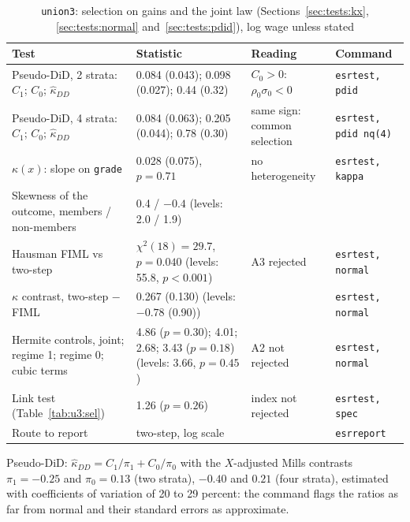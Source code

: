 \documentclass[11pt,a4paper]{article}
\theoremstyle{plain}
\theoremstyle{definition}
\theoremstyle{remark}
\newcommand{\1}{\mathbf{1}}
\newcommand{\cmd}[1]{\texttt{#1}}
\newcommand{\kX}{\kappa(x)}
\begin{document}
\begin{table}[!htb]
\centering
\caption{\cmd{union3}: selection on gains and the joint law (Sections~\ref{sec:tests:kx}, \ref{sec:tests:normal} and~\ref{sec:tests:pdid}), log wage unless stated}
\label{tab:u3:tests}
\scriptsize
\begin{tabular}{@{}L{4.2cm}L{5.6cm}L{2.5cm}L{2.3cm}@{}}
\toprule
Test & Statistic & Reading & Command \\
\midrule
Pseudo-DiD, 2 strata: $C_1$; $C_0$; $\hat\kappa_{DD}$ & 0.084 (0.043); 0.098 (0.027); 0.44 (0.32) & $C_0>0$: $\rho_0\sigma_0<0$ & \cmd{esrtest, pdid} \\
Pseudo-DiD, 4 strata: $C_1$; $C_0$; $\hat\kappa_{DD}$ & 0.084 (0.063); 0.205 (0.044); 0.78 (0.30) & same sign: common selection & \cmd{esrtest, pdid nq(4)} \\
$\kX$: slope on \cmd{grade} & 0.028 (0.075), $p=0.71$ & no heterogeneity & \cmd{esrtest, kappa} \\
\addlinespace
Skewness of the outcome, members / non-members & 0.4 / $-0.4$ (levels: 2.0 / 1.9) & & \\
Hausman FIML vs two-step & $\chi^2(18)=29.7$, $p=0.040$ (levels: 55.8, $p<0.001$) & A3 rejected & \cmd{esrtest, normal} \\
$\kappa$ contrast, two-step $-$ FIML & 0.267 (0.130) (levels: $-0.78$ (0.90)) & & \cmd{esrtest, normal} \\
Hermite controls, joint; regime 1; regime 0; cubic terms & 4.86 ($p=0.30$); 4.01; 2.68; 3.43 ($p=0.18$) (levels: 3.66, $p=0.45$) & A2 not rejected & \cmd{esrtest, normal} \\
Link test (Table~\ref{tab:u3:sel}) & 1.26 ($p=0.26$) & index not rejected & \cmd{esrtest, spec} \\
\midrule
Route to report & two-step, log scale & & \cmd{esrreport} \\
\bottomrule
\end{tabular}
\parbox{0.95\textwidth}{\footnotesize Pseudo-DiD: $\hat\kappa_{DD}=C_1/\pi_1+C_0/\pi_0$ with the $X$-adjusted Mills contrasts $\pi_1=-0.25$ and $\pi_0=0.13$ (two strata), $-0.40$ and $0.21$ (four strata), estimated with coefficients of variation of 20 to 29 percent: the command flags the ratios as far from normal and their standard errors as approximate.}
\end{table}
\end{document}
